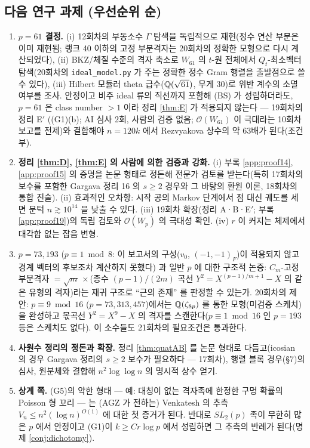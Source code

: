 \subsection{다음 연구 과제 (우선순위 순)}
\begin{enumerate}
\item \textbf{$p=61$ 결정.} (i) 12회차의 부동소수 $\Gamma$ 탐색을 독립적으로 재현(정수 연산 부분은 이미 재현됨; 랭크 40 이하의 고정 부분격자는 20회차의 정확한 모형으로 다시 계산되었다), (ii) BKZ/체질 수준의 격자 축소로 $W_{61}$ 의 $t$-원 전체에서 $Q_t$-최소벡터 탐색(20회차의 \texttt{ideal\_model.py} 가 주는 정확한 정수 Gram 행렬을 출발점으로 쓸 수 있다), (iii) Hilbert 모듈러 theta 급수($\mathbb{Q}(\sqrt{61})$, 무게 30)로 위반 계수의 소멸 여부를 조사. 안정이고 비주 ideal 류의 직선까지 포함해 (BS) 가 성립하더라도, $p=61$ 은 class number $>1$ 이라 정리 \ref{thm:E} 가 적용되지 않는다 --- 19회차의 정리 E$'$ ((G1)(b); AI 심사 2회, 사람의 검증 없음; $\mathcal O(W_{61})$ 이 극대라는 10회차 보고를 전제)와 결합해야 $n=120k$ 에서 Rezvyakova 상수의 약 63배가 된다(조건부).
\item \textbf{정리 \ref{thm:D}, \ref{thm:E} 의 사람에 의한 검증과 강화.} (i) 부록 \ref{app:proof14}, \ref{app:proof15} 의 증명을 논문 형태로 정돈해 전문가 검토를 받는다(특히 17회차의 보수를 포함한 Gargava 정리 16 의 $s\ge2$ 경우와 그 바탕의 환원 이론, 18회차의 통합 진술). (ii) 효과적인 오차항: 시작 공의 Markov 단계에서 점 대신 궤도를 세면 문턱 $n\gtrsim10^{14}$ 을 낮출 수 있다. (iii) 19회차 확장(정리 A·B·E$'$; 부록 \ref{app:proof19})의 독립 검토와 $\mathcal O(W_p)$ 의 극대성 확인. (iv) $r$ 이 커지는 체제에서 대각합 없는 잡음 변형.
\item \textbf{$p=73,193$} ($p\equiv1\bmod8$: 이 보고서의 구성($v_0$, $(-1,-1)_F$)이 적용되지 않고 경계 벡터의 후보조차 계산하지 못했다) 과 일반 $p$ 에 대한 구조적 논증: $C_m$-고정 부분격자 $=\sqrt m\,\times$(종수 $(p-1)/(2m)$ 곡선 $Y^2=X^{(p-1)/m+1}-X$ 의 같은 유형의 격자)라는 재귀 구조로 ``근의 존재'' 를 판정할 수 있는가. 20회차의 제안: $p\equiv9\bmod16$ ($p=73,313,457$)에서는 $\mathbb{Q}(\zeta_{8p})$ 를 통한 모형(미검증 스케치)을 완성하고 몫곡선 $Y^2=X^9-X$ 의 격자를 스캔한다($p\equiv1\bmod16$ 인 $p=193$ 등은 스케치도 없다). 이 소수들도 21회차의 필요조건은 통과한다.
\item \textbf{사원수 정리의 정돈과 확장.} 정리 \ref{thm:quatAB} 를 논문 형태로 다듬고(icosian 의 경우 Gargava 정리의 $s\ge2$ 보수가 필요하다 --- 17회차), 행렬 블록 경우(\S7)의 심사, 원분체와 결합해 $n^2\log\log n$ 의 명시적 상수 얻기.
\item \textbf{상계 쪽.} (G5)의 약한 형태 --- 예: 대칭이 없는 격자족에 한정한 구멍 확률의 Poisson 형 꼬리 --- 는 (AGZ 가 전하는) Venkatesh 의 추측 $V_n\le n^2(\log n)^{O(1)}$ 에 대한 첫 증거가 된다. 반대로 $SL_2(p)$ 족이 무한히 많은 $p$ 에서 안정이고 (G1)이 $k\ge Cr\log p$ 에서 성립하면 그 추측의 반례가 된다(명제 \ref{conj:dichotomy}).

\end{enumerate}
